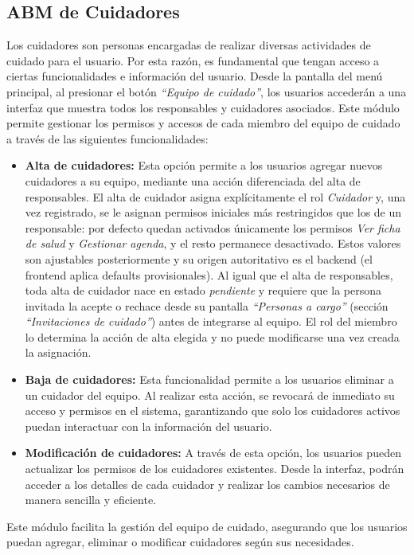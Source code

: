 \documentclass[a4paper,12pt]{article}
\begin{document}
    \subsection{ABM de Cuidadores}
    \par Los cuidadores son personas encargadas de realizar diversas actividades de cuidado para el usuario. Por esta razón, es fundamental que tengan acceso a ciertas funcionalidades e información del usuario. Desde la pantalla del menú principal, al presionar el botón \textit{``Equipo de cuidado''}, los usuarios accederán a una interfaz que muestra todos los responsables y cuidadores asociados. Este módulo permite gestionar los permisos y accesos de cada miembro del equipo de cuidado a través de las siguientes funcionalidades:
    \begin{itemize}
        \item \textbf{Alta de cuidadores:} Esta opción permite a los usuarios agregar nuevos cuidadores a su equipo, mediante una acción diferenciada del alta de responsables. El alta de cuidador asigna explícitamente el rol \textit{Cuidador} y, una vez registrado, se le asignan permisos iniciales más restringidos que los de un responsable: por defecto quedan activados únicamente los permisos \textit{Ver ficha de salud} y \textit{Gestionar agenda}, y el resto permanece desactivado. Estos valores son ajustables posteriormente y su origen autoritativo es el backend (el frontend aplica defaults provisionales). Al igual que el alta de responsables, toda alta de cuidador nace en estado \textit{pendiente} y requiere que la persona invitada la acepte o rechace desde su pantalla \textit{``Personas a cargo''} (sección \textit{``Invitaciones de cuidado''}) antes de integrarse al equipo. El rol del miembro lo determina la acción de alta elegida y no puede modificarse una vez creada la asignación.
        \item \textbf{Baja de cuidadores:} Esta funcionalidad permite a los usuarios eliminar a un cuidador del equipo. Al realizar esta acción, se revocará de inmediato su acceso y permisos en el sistema, garantizando que solo los cuidadores activos puedan interactuar con la información del usuario.
        \item \textbf{Modificación de cuidadores:} A través de esta opción, los usuarios pueden actualizar los permisos de los cuidadores existentes. Desde la interfaz, podrán acceder a los detalles de cada cuidador y realizar los cambios necesarios de manera sencilla y eficiente.
    \end{itemize}
    \par Este módulo facilita la gestión del equipo de cuidado, asegurando que los usuarios puedan agregar, eliminar o modificar cuidadores según sus necesidades.
\end{document}
